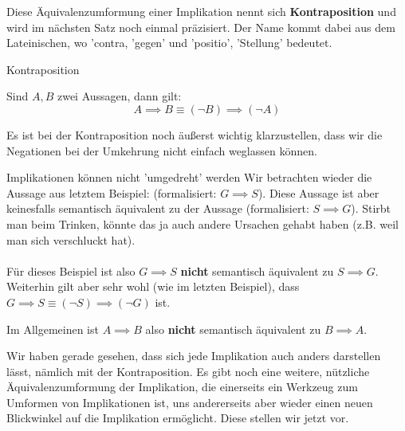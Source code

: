 \documentclass[../../main.tex]{subfiles}
\begin{document}
    Diese Äquivalenzumformung einer Implikation nennt sich \textbf{Kontraposition} 
    und wird im nächsten Satz noch einmal präzisiert.  Der Name kommt dabei aus dem Lateinischen, wo 'contra, 'gegen'
    und 'positio', 'Stellung' bedeutet. 
    
    \begin{theorem}{Kontraposition}

    Sind $A,B$ zwei Aussagen, dann gilt:
        \[A \implies B  \equiv (\lnot B) \implies (\lnot A)\]
    \end{theorem}

    Es ist bei der Kontraposition noch äußerst wichtig klarzustellen, dass wir die Negationen bei der Umkehrung
    nicht einfach weglassen können. 

    \begin{example}{Implikationen können nicht 'umgedreht' werden}
        Wir betrachten wieder die Aussage aus letztem Beispiel:  (formalisiert: $G \implies S$). Diese Aussage ist aber 
        keinesfalls semantisch äquivalent zu der 
        Aussage  (formalisiert: $S \implies G$).
        Stirbt man beim Trinken, könnte das ja auch andere Ursachen gehabt haben (z.B. weil man sich verschluckt hat).
        \\ \\
        Für dieses Beispiel ist also $G \implies S$ \textbf{nicht} semantisch äquivalent zu $S \implies G$.
        Weiterhin gilt aber sehr wohl (wie im letzten Beispiel), 
        dass $G \implies S \equiv (\lnot S) \implies (\lnot G)$ ist.

    \end{example}

    Im Allgemeinen ist $A \implies B$ also \textbf{nicht} semantisch äquivalent zu $B \implies A$.

    Wir haben gerade gesehen, dass sich jede Implikation auch anders darstellen lässt, 
    nämlich mit der Kontraposition. Es gibt noch eine weitere, nützliche Äquivalenzumformung 
    der Implikation, die einerseits ein Werkzeug zum Umformen von Implikationen ist, uns
    andererseits aber wieder einen neuen Blickwinkel auf die Implikation ermöglicht.
    Diese stellen wir jetzt vor.
    
\end{document}
